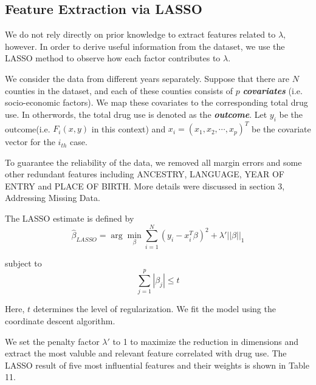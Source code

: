 
\subsection{Feature Extraction via LASSO}
We do not rely directly on prior knowledge to extract features related to $\lambda$, however. In order to derive useful information from the dataset, we use the LASSO method to observe how each factor contributes to $\lambda$. 

We consider the data from different years separately. Suppose that there are $N$ counties in the dataset, and each of these counties consists of $p$ \textbf{ \itshape covariates} (i.e. socio-economic factors). We map these covariates to the corresponding total drug use. In otherwords, the total drug use is denoted as the \textbf{ \itshape outcome}. Let $y_i$ be the outcome(i.e. $F_i(x,y)$ in this context) and $x_i = (x_1, x_2, \cdots, x_p)^T$ be the covariate vector for the $i_{th}$ case.

To guarantee the reliability of the data, we removed all margin errors and some other redundant features including ANCESTRY, LANGUAGE, YEAR OF ENTRY and PLACE OF BIRTH. More details were discussed in section 3, Addressing Missing Data.

The LASSO estimate is defined by\cite{7}
\begin{equation}
\hat{\beta}_{LASSO}=
\arg\min_{\beta} \sum_{i=1}^{N}(y_i - x_i^T\beta)^2 + \lambda'||\beta||_1
\end{equation}

subject to
\begin{equation}
 \sum_{j=1}^{p}|\beta_j|\leq t
\end{equation}

Here, $t$ determines the level of regularization. We fit the model using the coordinate descent algorithm. \cite{6}

We set the penalty factor $\lambda'$ to 1 to maximize the reduction in dimensions and extract the most valuble and relevant feature correlated with drug use. The LASSO result of five most influential features and their weights is shown in Table 11.

